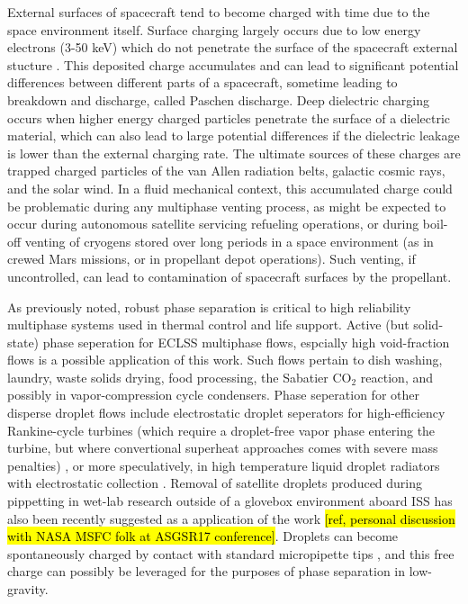\documentclass[10pt,a4paper]{article}
\begin{document}
External surfaces of spacecraft tend to become charged with time due to the space environment itself. Surface charging largely occurs due to low energy electrons (3-50 keV) which do not penetrate the surface of the spacecraft external stucture \cite{czepiela_charging_1997}. This deposited charge accumulates and can lead to significant potential differences between different parts of a spacecraft, sometime leading to breakdown and discharge, called Paschen discharge. Deep dielectric charging occurs when higher energy charged particles penetrate the surface of a dielectric material, which can also lead to large potential differences if the dielectric leakage is lower than the external charging rate. The ultimate sources of these charges are trapped charged particles of the van Allen radiation belts, galactic cosmic rays, and the solar wind. In a fluid mechanical context, this accumulated charge could be problematic during any multiphase venting process, as might be expected to occur during autonomous satellite servicing refueling operations, or during boil-off venting of cryogens stored over long periods in a space environment (as in crewed Mars missions, or in propellant depot operations). Such venting, if uncontrolled, can lead to contamination of spacecraft surfaces by the propellant.

As previously noted, robust phase separation is critical to high reliability multiphase systems used in thermal control and life support. Active (but solid-state) phase seperation for ECLSS multiphase flows, espcially high void-fraction flows is a possible application of this work. Such flows pertain to dish washing, laundry, waste solids drying, food processing, the Sabatier CO$_2$ reaction, and possibly in vapor-compression cycle condensers. Phase seperation for other disperse droplet flows include electrostatic droplet seperators for high-efficiency Rankine-cycle turbines (which require a droplet-free vapor phase entering the turbine, but where convertional superheat approaches comes with severe mass penalties) \cite{unterberg_zero_1962}, or more speculatively, in high temperature liquid droplet radiators with electrostatic collection \cite{white_liquid_1987}. Removal of satellite droplets produced during pippetting in wet-lab research outside of a glovebox environment aboard ISS has also been recently suggested as a application of the work \hl{[ref, personal discussion with NASA MSFC folk at ASGSR17 conference]}. Droplets can become spontaneously charged by contact with standard micropipette tips \cite{choi_spontaneous_2013}, and this free charge can possibly be leveraged for the purposes of phase separation in low-gravity. 
\end{document}
